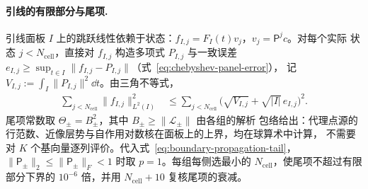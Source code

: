 \paragraph{引线的有限部分与尾项.}
引线面板 $I$ 上的跳跃线性依赖于状态：$f_{I,j}=F_I(t)v_j$，$v_j=\mathsf P^jc$。对每个实际
状态 $j<N_{\mathrm{cell}}$，直接对 $f_{I,j}$ 构造多项式 $P_{I,j}$ 与一致误差
$e_{I,j}\geq\sup_{t\in I}\lVert f_{I,j}-P_{I,j}\rVert$（式~\eqref{eq:chebyshev-panel-error}），
记 $V_{I,j}:=\int_I\lVert P_{I,j}\rVert^2\dd t$。由三角不等式，
\begin{align}
  \sum_{j<N_{\mathrm{cell}}}\lVert f_{I,j}\rVert_{L^2(I)}^2
  &\leq\sum_{j<N_{\mathrm{cell}}}\bigl(\sqrt{V_{I,j}}+\sqrt{|I|}\,e_{I,j}\bigr)^2 .
  \label{eq:lead-finite-bound}
\end{align}
尾项常数取 $\Theta_\pm=B_\pm^2$，其中 $B_\pm\geq\lVert\mathcal L_\pm\rVert$ 由各组的解析
包络给出：代理点源的行范数、近像层势与自作用对数核在面板上的上界，均在球算术中计算，
不需要对 $K$ 个基向量逐列评价。代入式~\eqref{eq:boundary-propagation-tail}，
$\lVert\mathsf P_\pm\rVert_2\leq\lVert\mathsf P_\pm\rVert_F<1$ 时取 $p=1$。每组每侧选最小的
$N_{\mathrm{cell}}$，使尾项不超过有限部分下界的 $10^{-6}$ 倍，并用 $N_{\mathrm{cell}}+10$
复核尾项的衰减。

